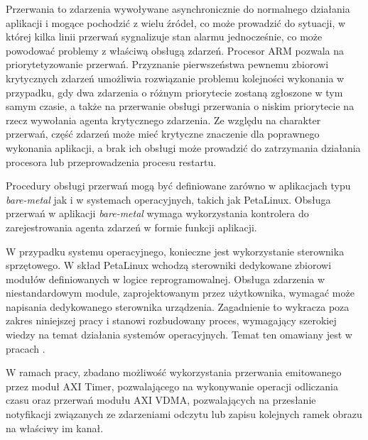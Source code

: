 Przerwania to zdarzenia wywoływane asynchronicznie do normalnego działania aplikacji i mogące pochodzić z wielu źródeł, co może prowadzić do sytuacji, w której kilka linii przerwań sygnalizuje stan alarmu jednocześnie, co może powodować problemy z właściwą obsługą zdarzeń. %
Procesor ARM pozwala na priorytetyzowanie przerwań. 
Przyznanie pierwszeństwa pewnemu zbiorowi krytycznych zdarzeń umożliwia rozwiązanie problemu kolejności wykonania w przypadku, gdy dwa zdarzenia o różnym priorytecie zostaną zgłoszone w tym samym czasie, a także na przerwanie obsługi przerwania o niskim priorytecie na rzecz wywołania agenta krytycznego zdarzenia.
Ze względu na charakter przerwań, część zdarzeń może mieć krytyczne znaczenie dla poprawnego wykonania aplikacji, a brak ich obsługi może prowadzić do zatrzymania działania procesora lub przeprowadzenia procesu restartu.

Procedury obsługi przerwań mogą być definiowane zarówno w aplikacjach typu \textit{bare-metal} jak i w systemach operacyjnych, takich jak PetaLinux.
Obsługa przerwań w aplikacji \textit{bare-metal} wymaga wykorzystania kontrolera do zarejestrowania agenta zdarzeń w formie funkcji aplikacji.

W przypadku systemu operacyjnego, konieczne jest wykorzystanie sterownika sprzętowego. 
W skład PetaLinux wchodzą sterowniki dedykowane zbiorowi modułów definiowanych w logice reprogramowalnej. 
Obsługa zdarzenia w niestandardowym module, zaprojektowanym przez użytkownika, wymagać może napisania dedykowanego sterownika urządzenia.
Zagadnienie to wykracza poza zakres niniejszej pracy i stanowi rozbudowany proces, wymagający szerokiej wiedzy na temat działania systemów operacyjnych. 
Temat ten omawiany jest w pracach \cite{Love2014,Corbet2005}.

W ramach pracy, zbadano możliwość wykorzystania przerwania emitowanego przez moduł AXI Timer, pozwalającego na wykonywanie operacji odliczania czasu oraz przerwań modułu AXI VDMA, pozwalających na przesłanie notyfikacji związanych ze zdarzeniami odczytu lub zapisu kolejnych ramek obrazu na właściwy im kanał.

